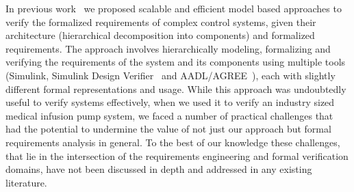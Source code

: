In previous work~\cite{hilt2013, req2code} we proposed scalable and efficient model based approaches to verify the formalized requirements of complex control systems, given their architecture (hierarchical decomposition into components) and formalized requirements. The approach involves hierarchically modeling, formalizing and verifying the requirements of the system and its components using multiple tools (Simulink, Simulink Design Verifier~\cite{SimulinkDesignVerifier} and AADL/AGREE~\cite{NFM2012:CoGaMiWhLaLu}), each with slightly different formal representations and usage. While this approach was undoubtedly useful to verify systems effectively, when we used it to verify an industry sized medical infusion pump system, we faced a number of practical challenges that had the potential to undermine the value of not just our approach but formal requirements analysis in general. To the best of our knowledge these challenges, that lie in the intersection of the requirements engineering and formal verification domains, have not been discussed in depth and addressed in any existing literature.

